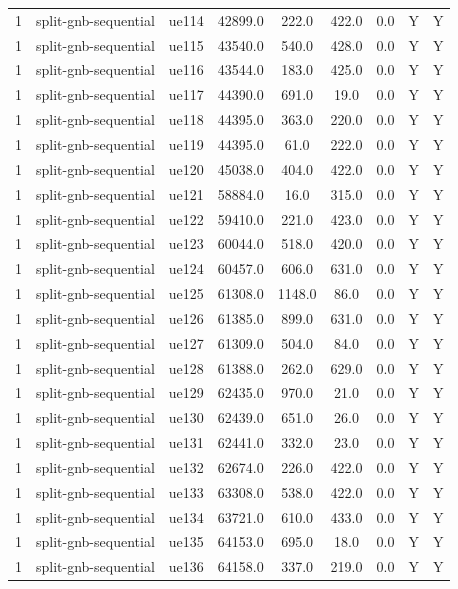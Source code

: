 \begin{table}[ht]
\begin{tabular}{|c|c|c|c|c|c|c|c|c|}
1 & split-gnb-sequential & ue114 & 42899.0 & 222.0 & 422.0 & 0.0 & Y & Y \\
1 & split-gnb-sequential & ue115 & 43540.0 & 540.0 & 428.0 & 0.0 & Y & Y \\
1 & split-gnb-sequential & ue116 & 43544.0 & 183.0 & 425.0 & 0.0 & Y & Y \\
1 & split-gnb-sequential & ue117 & 44390.0 & 691.0 & 19.0 & 0.0 & Y & Y \\
1 & split-gnb-sequential & ue118 & 44395.0 & 363.0 & 220.0 & 0.0 & Y & Y \\
1 & split-gnb-sequential & ue119 & 44395.0 & 61.0 & 222.0 & 0.0 & Y & Y \\
1 & split-gnb-sequential & ue120 & 45038.0 & 404.0 & 422.0 & 0.0 & Y & Y \\
1 & split-gnb-sequential & ue121 & 58884.0 & 16.0 & 315.0 & 0.0 & Y & Y \\
1 & split-gnb-sequential & ue122 & 59410.0 & 221.0 & 423.0 & 0.0 & Y & Y \\
1 & split-gnb-sequential & ue123 & 60044.0 & 518.0 & 420.0 & 0.0 & Y & Y \\
1 & split-gnb-sequential & ue124 & 60457.0 & 606.0 & 631.0 & 0.0 & Y & Y \\
1 & split-gnb-sequential & ue125 & 61308.0 & 1148.0 & 86.0 & 0.0 & Y & Y \\
1 & split-gnb-sequential & ue126 & 61385.0 & 899.0 & 631.0 & 0.0 & Y & Y \\
1 & split-gnb-sequential & ue127 & 61309.0 & 504.0 & 84.0 & 0.0 & Y & Y \\
1 & split-gnb-sequential & ue128 & 61388.0 & 262.0 & 629.0 & 0.0 & Y & Y \\
1 & split-gnb-sequential & ue129 & 62435.0 & 970.0 & 21.0 & 0.0 & Y & Y \\
1 & split-gnb-sequential & ue130 & 62439.0 & 651.0 & 26.0 & 0.0 & Y & Y \\
1 & split-gnb-sequential & ue131 & 62441.0 & 332.0 & 23.0 & 0.0 & Y & Y \\
1 & split-gnb-sequential & ue132 & 62674.0 & 226.0 & 422.0 & 0.0 & Y & Y \\
1 & split-gnb-sequential & ue133 & 63308.0 & 538.0 & 422.0 & 0.0 & Y & Y \\
1 & split-gnb-sequential & ue134 & 63721.0 & 610.0 & 433.0 & 0.0 & Y & Y \\
1 & split-gnb-sequential & ue135 & 64153.0 & 695.0 & 18.0 & 0.0 & Y & Y \\
1 & split-gnb-sequential & ue136 & 64158.0 & 337.0 & 219.0 & 0.0 & Y & Y \\

\end{tabular}
\end{table}

